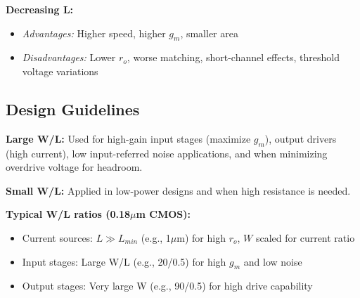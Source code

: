 \documentclass[main.tex]{subfiles}
\begin{document}
\textbf{Decreasing L:}
\begin{itemize}
    \item \textit{Advantages:} Higher speed, higher $g_m$, smaller area
    \item \textit{Disadvantages:} Lower $r_o$, worse matching, short-channel effects, threshold voltage variations
\end{itemize}

\subsection*{Design Guidelines}

\textbf{Large W/L:} Used for high-gain input stages (maximize $g_m$), output drivers (high current), low input-referred noise applications, and when minimizing overdrive voltage for headroom.

\textbf{Small W/L:} Applied in low-power designs and when high resistance is needed.

\textbf{Typical W/L ratios (0.18$\mu$m CMOS):}
\begin{itemize}
    \item Current sources: $L \gg L_{min}$ (e.g., 1$\mu$m) for high $r_o$, $W$ scaled for current ratio
    \item Input stages: Large W/L (e.g., 20/0.5) for high $g_m$ and low noise
    \item Output stages: Very large W (e.g., 90/0.5) for high drive capability
\end{itemize}
\end{document}

